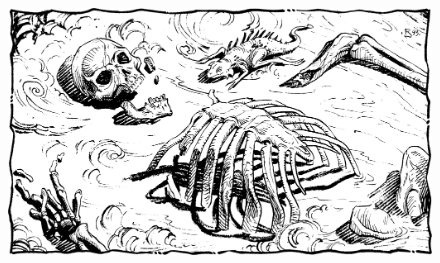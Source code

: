 

\vskip1cm

\begin{figure}[b!]
\centering
\includegraphics[width=\textwidth]{images/skeleton-1.png}
\WOTC
\end{figure}


